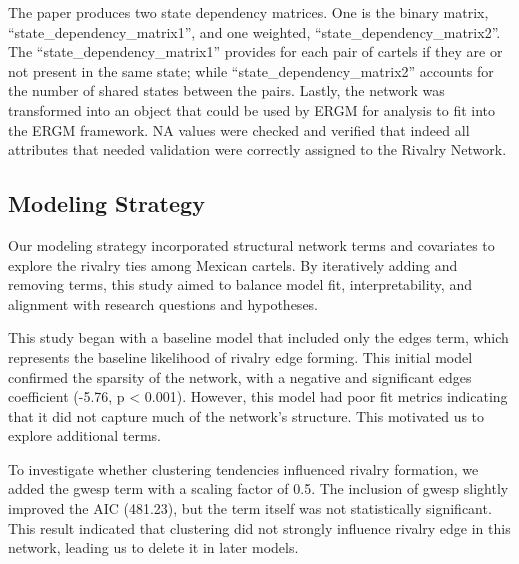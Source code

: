 \documentclass[
]{article}
\begin{document}
The paper produces two state dependency matrices. One is the binary
matrix, ``state\_dependency\_matrix1'', and one weighted,
``state\_dependency\_matrix2''. The ``state\_dependency\_matrix1''
provides for each pair of cartels if they are or not present in the same
state; while ``state\_dependency\_matrix2'' accounts for the number of
shared states between the pairs. Lastly, the network was transformed
into an object that could be used by ERGM for analysis to fit into the
ERGM framework. NA values were checked and verified that indeed all
attributes that needed validation were correctly assigned to the Rivalry
Network.

\subsection{Modeling Strategy}\label{modeling-strategy}

Our modeling strategy incorporated structural network terms and
covariates to explore the rivalry ties among Mexican cartels. By
iteratively adding and removing terms, this study aimed to balance model
fit, interpretability, and alignment with research questions and
hypotheses.

This study began with a baseline model that included only the edges
term, which represents the baseline likelihood of rivalry edge forming.
This initial model confirmed the sparsity of the network, with a
negative and significant edges coefficient (-5.76, p \textless{} 0.001).
However, this model had poor fit metrics indicating that it did not
capture much of the network's structure. This motivated us to explore
additional terms.

To investigate whether clustering tendencies influenced rivalry
formation, we added the gwesp term with a scaling factor of 0.5. The
inclusion of gwesp slightly improved the AIC (481.23), but the term
itself was not statistically significant. This result indicated that
clustering did not strongly influence rivalry edge in this network,
leading us to delete it in later models.
\end{document}
